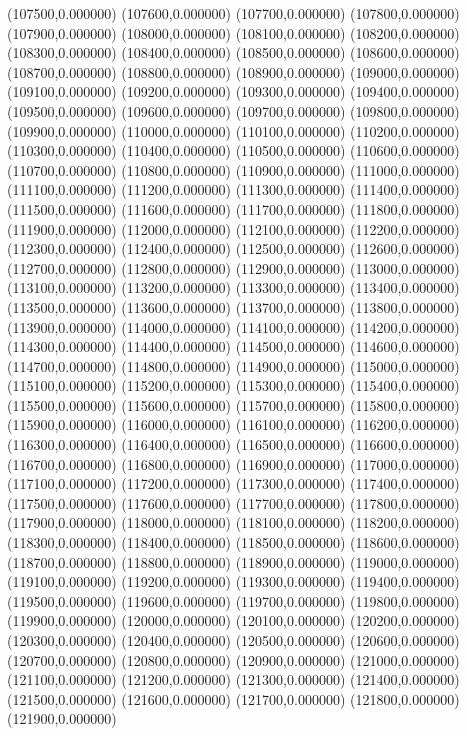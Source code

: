 (107500,0.000000)
(107600,0.000000)
(107700,0.000000)
(107800,0.000000)
(107900,0.000000)
(108000,0.000000)
(108100,0.000000)
(108200,0.000000)
(108300,0.000000)
(108400,0.000000)
(108500,0.000000)
(108600,0.000000)
(108700,0.000000)
(108800,0.000000)
(108900,0.000000)
(109000,0.000000)
(109100,0.000000)
(109200,0.000000)
(109300,0.000000)
(109400,0.000000)
(109500,0.000000)
(109600,0.000000)
(109700,0.000000)
(109800,0.000000)
(109900,0.000000)
(110000,0.000000)
(110100,0.000000)
(110200,0.000000)
(110300,0.000000)
(110400,0.000000)
(110500,0.000000)
(110600,0.000000)
(110700,0.000000)
(110800,0.000000)
(110900,0.000000)
(111000,0.000000)
(111100,0.000000)
(111200,0.000000)
(111300,0.000000)
(111400,0.000000)
(111500,0.000000)
(111600,0.000000)
(111700,0.000000)
(111800,0.000000)
(111900,0.000000)
(112000,0.000000)
(112100,0.000000)
(112200,0.000000)
(112300,0.000000)
(112400,0.000000)
(112500,0.000000)
(112600,0.000000)
(112700,0.000000)
(112800,0.000000)
(112900,0.000000)
(113000,0.000000)
(113100,0.000000)
(113200,0.000000)
(113300,0.000000)
(113400,0.000000)
(113500,0.000000)
(113600,0.000000)
(113700,0.000000)
(113800,0.000000)
(113900,0.000000)
(114000,0.000000)
(114100,0.000000)
(114200,0.000000)
(114300,0.000000)
(114400,0.000000)
(114500,0.000000)
(114600,0.000000)
(114700,0.000000)
(114800,0.000000)
(114900,0.000000)
(115000,0.000000)
(115100,0.000000)
(115200,0.000000)
(115300,0.000000)
(115400,0.000000)
(115500,0.000000)
(115600,0.000000)
(115700,0.000000)
(115800,0.000000)
(115900,0.000000)
(116000,0.000000)
(116100,0.000000)
(116200,0.000000)
(116300,0.000000)
(116400,0.000000)
(116500,0.000000)
(116600,0.000000)
(116700,0.000000)
(116800,0.000000)
(116900,0.000000)
(117000,0.000000)
(117100,0.000000)
(117200,0.000000)
(117300,0.000000)
(117400,0.000000)
(117500,0.000000)
(117600,0.000000)
(117700,0.000000)
(117800,0.000000)
(117900,0.000000)
(118000,0.000000)
(118100,0.000000)
(118200,0.000000)
(118300,0.000000)
(118400,0.000000)
(118500,0.000000)
(118600,0.000000)
(118700,0.000000)
(118800,0.000000)
(118900,0.000000)
(119000,0.000000)
(119100,0.000000)
(119200,0.000000)
(119300,0.000000)
(119400,0.000000)
(119500,0.000000)
(119600,0.000000)
(119700,0.000000)
(119800,0.000000)
(119900,0.000000)
(120000,0.000000)
(120100,0.000000)
(120200,0.000000)
(120300,0.000000)
(120400,0.000000)
(120500,0.000000)
(120600,0.000000)
(120700,0.000000)
(120800,0.000000)
(120900,0.000000)
(121000,0.000000)
(121100,0.000000)
(121200,0.000000)
(121300,0.000000)
(121400,0.000000)
(121500,0.000000)
(121600,0.000000)
(121700,0.000000)
(121800,0.000000)
(121900,0.000000)
